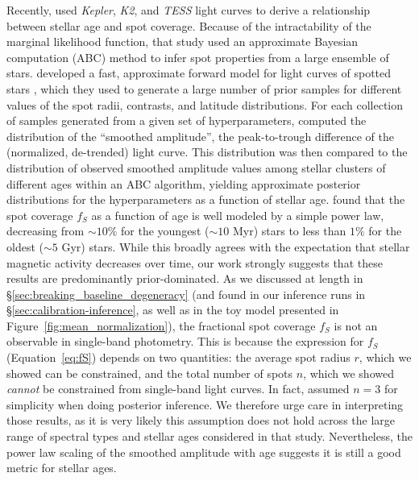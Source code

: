 \documentclass[modern]{aastex62}
\begin{document}

Recently, \citet{Morris2020} used \emph{Kepler}, \emph{K2}, and \emph{TESS}
light curves to derive a relationship between stellar age and spot
coverage. Because of the intractability of the marginal likelihood function,
that study used an approximate Bayesian computation (ABC) method to
infer spot properties from a large ensemble of stars. \citet{Morris2020}
developed a fast, approximate forward model for light curves of spotted stars
\citep[\textsf{fleck};][]{Morris2020b}, which they used to generate a large
number of prior samples for different values of the spot radii, contrasts,
and latitude distributions. For each collection of samples generated from a
given set of hyperparameters, \citet{Morris2020} computed the distribution of
the ``smoothed amplitude'',
the peak-to-trough difference of the (normalized, de-trended) light curve.
This distribution was then compared to the distribution of observed
smoothed amplitude values among stellar clusters of different ages
within an ABC algorithm, yielding approximate
posterior distributions for the hyperparameters as a function of
stellar age. \citet{Morris2020} found that the spot coverage $f_S$ as a
function of age is well modeled by a simple power law, decreasing from
${\sim}10\%$ for the youngest (${\sim}10$ Myr) stars
to less than $1\%$ for the oldest (${\sim}5$ Gyr) stars.
%
While this broadly agrees with the expectation that stellar
magnetic activity decreases over time, our work strongly suggests
that these results are predominantly prior-dominated. As we discussed
at length
in \S\ref{sec:breaking_baseline_degeneracy} (and found in our inference
runs in \S\ref{sec:calibration-inference}, as well as in the toy
model presented in Figure~\ref{fig:mean_normalization}), the fractional
spot coverage $f_S$ is not an observable in single-band photometry.
%
This is because the expression for $f_S$ (Equation~\ref{eq:fS}) depends on
two quantities: the average spot radius $r$, which we showed can be
constrained, and the total number of spots $n$, which
we showed \emph{cannot} be constrained from single-band light curves.
%
In fact, \citet{Morris2020} assumed $n=3$ for simplicity when doing
posterior inference. We therefore urge care in interpreting those results,
as it is very likely this assumption does not hold across the large
range of spectral types and stellar ages considered in that study.
Nevertheless, the power law scaling of the smoothed amplitude with
age suggests it is still a good metric for stellar ages.
\end{document}
